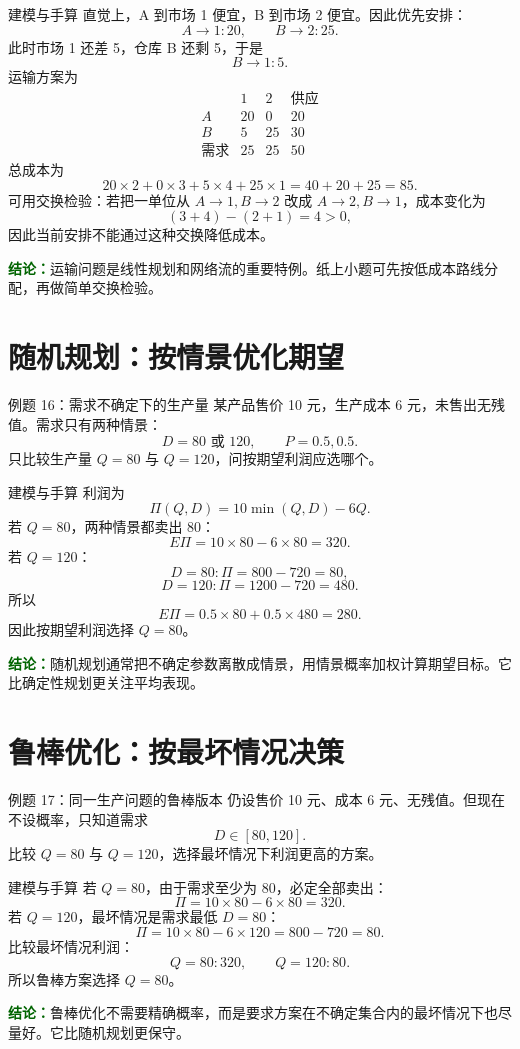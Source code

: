 \documentclass[UTF8,12pt,a4paper]{ctexart}
\newcommand{\conclusion}[1]{\par\smallskip\noindent\textcolor{darkgreen}{\textbf{结论：}}#1\par\smallskip}
\begin{document}
\begin{solbox}{建模与手算}
直觉上，A 到市场 1 便宜，B 到市场 2 便宜。因此优先安排：
\[
A\to 1:20,
\qquad B\to 2:25.
\]
此时市场 1 还差 5，仓库 B 还剩 5，于是
\[
B\to 1:5.
\]
运输方案为
\[
\begin{array}{c|cc|c}
&1&2&\text{供应}\\
\hline
A&20&0&20\\
B&5&25&30\\
\hline
\text{需求}&25&25&50
\end{array}
\]
总成本为
\[
20\times2+0\times3+5\times4+25\times1=40+20+25=85.
\]
可用交换检验：若把一单位从 $A\to1,B\to2$ 改成 $A\to2,B\to1$，成本变化为
\[
(3+4)-(2+1)=4>0,
\]
因此当前安排不能通过这种交换降低成本。
\end{solbox}
\conclusion{运输问题是线性规划和网络流的重要特例。纸上小题可先按低成本路线分配，再做简单交换检验。}

\section{随机规划：按情景优化期望}
\begin{examplebox}{例题 16：需求不确定下的生产量}
某产品售价 10 元，生产成本 6 元，未售出无残值。需求只有两种情景：
\[
D=80 \text{ 或 }120,
\qquad P=0.5,0.5.
\]
只比较生产量 $Q=80$ 与 $Q=120$，问按期望利润应选哪个。
\end{examplebox}

\begin{solbox}{建模与手算}
利润为
\[
\Pi(Q,D)=10\min(Q,D)-6Q.
\]
若 $Q=80$，两种情景都卖出 80：
\[
E\Pi=10\times80-6\times80=320.
\]
若 $Q=120$：
\[
D=80: \Pi=800-720=80,
\]
\[
D=120: \Pi=1200-720=480.
\]
所以
\[
E\Pi=0.5\times80+0.5\times480=280.
\]
因此按期望利润选择 $Q=80$。
\end{solbox}
\conclusion{随机规划通常把不确定参数离散成情景，用情景概率加权计算期望目标。它比确定性规划更关注平均表现。}

\section{鲁棒优化：按最坏情况决策}
\begin{examplebox}{例题 17：同一生产问题的鲁棒版本}
仍设售价 10 元、成本 6 元、无残值。但现在不设概率，只知道需求
\[
D\in[80,120].
\]
比较 $Q=80$ 与 $Q=120$，选择最坏情况下利润更高的方案。
\end{examplebox}

\begin{solbox}{建模与手算}
若 $Q=80$，由于需求至少为 80，必定全部卖出：
\[
\Pi=10\times80-6\times80=320.
\]
若 $Q=120$，最坏情况是需求最低 $D=80$：
\[
\Pi=10\times80-6\times120=800-720=80.
\]
比较最坏情况利润：
\[
Q=80:320,
\qquad Q=120:80.
\]
所以鲁棒方案选择 $Q=80$。
\end{solbox}
\conclusion{鲁棒优化不需要精确概率，而是要求方案在不确定集合内的最坏情况下也尽量好。它比随机规划更保守。}
\end{document}
